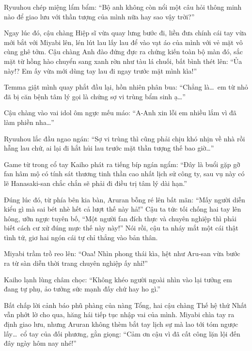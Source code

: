 \documentclass[../main.tex]{subfiles}
\begin{document}
Ryuuhou chép miệng lẩm bẩm: ``Bộ anh không còn nổi một câu hỏi thông minh nào để giao lưu với thần tượng của mình nữa hay sao vậy trời?''

Ngay lúc đó, cậu chàng Hiệp sĩ vừa quay lưng bước đi, liền đưa chính cái tay vừa mới bắt với Miyabi lên, lén lút lau lấy lau để vào vạt áo của mình với vẻ mặt vô cùng ghê tởm. Cậu chàng Anh đào đứng đực ra chứng kiến toàn bộ màn đó, sắc mặt từ hồng hào chuyển sang xanh rờn như tàu lá chuối, bất bình thét lên: ``Ủa này!? Em ấy vừa mới dùng tay lau đi ngay trước mặt mình kìa!''


Temma giật mình quay phắt đầu lại, hồn nhiên phân bua: ``Chẳng là\dots\ em từ nhỏ đã bị căn bệnh tâm lý gọi là chứng sợ vi trùng bẩm sinh ạ\dots''

Cậu chàng vào vai idol ôm ngực mếu máo: ``A-Anh xin lỗi em nhiều lắm vì đã làm phiền nha\dots''

Ryuuhou lắc đầu ngao ngán: ``Sợ vi trùng thì cũng phải chịu khó nhịn về nhà rồi hẵng lau chứ, ai lại đi hắt hủi lau trước mặt thần tượng thế bao giờ\dots''

Game từ trong cổ tay Kaiho phát ra tiếng bíp ngán ngẩm: ``Đây là buổi gặp gỡ fan hâm mộ có tính sát thương tinh thần cao nhất lịch sử công ty, sau vụ này có lẽ Hanasaki-san chắc chắn sẽ phải đi điều trị tâm lý dài hạn.''

Đúng lúc đó, từ phía bên kia bàn, Aruran bỗng ré lên bất mãn: ``Mấy người diễn kiểu gì mà sai bét nhè hết cả lượt thế này hả!'' Cậu ta tức tối chống hai tay lên hông, ưỡn ngực tuyên bố, ``Một người fan đích thực và chuyên nghiệp thì phải biết cách cư xử đúng mực thế này này!'' Nói rồi, cậu ta nháy mắt một cái thật tình tứ, giơ hai ngón cái tự chỉ thẳng vào bản thân.


Miyabi trầm trồ reo lên: ``Oaa! Nhìn phong thái kìa, hệt như Aru-san vừa bước ra từ sàn diễn thời trang chuyên nghiệp ấy nhỉ!''

Kaiho lạnh lùng châm chọc: ``Không khéo người ngoài nhìn vào lại tưởng em đang tự phụ, ảo tưởng sức mạnh đấy chứ hay ho gì.''

Bất chấp lời cảnh báo phũ phàng của nàng Tổng, hai cậu chàng Thế hệ thứ Nhất vẫn phớt lờ cho qua, hăng hái tiếp tục nhập vai của mình. Miyabi chìa tay ra định giao lưu, nhưng Aruran không thèm bắt tay lịch sự mà lao tới tóm ngược lấy\dots\ cổ tay của đối phương, gằn giọng: ``Cảm ơn cậu vì đã cất công lặn lội đến đây ngày hôm nay nhé!''
\end{document}
